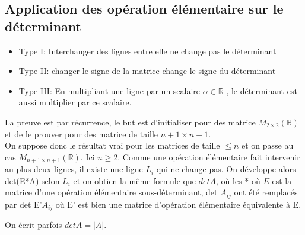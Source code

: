 
\subsection{Application des opération élémentaire sur le déterminant}
\begin{itemize}
    \item Type I: Interchanger des lignes entre elle ne change pas le déterminant
    \item Type II: changer le signe de la matrice change le signe du déterminant
    \item Type III: En multipliant une ligne par un scalaire $\alpha \in \mathbb{R}$ , le déterminant est aussi multiplier par ce scalaire.

     
\end{itemize}

La preuve est par récurrence, le but est d'initialiser pour des matrice $M_{2\times 2}(\mathbb{R})$ et de le prouver pour des matrice de taille $n+1\times n+1$. 
\\
On suppose donc le résultat vrai pour les matrices de taille $\leq n$ et on passe au cas $M_{n+1\times n+1}(\mathbb{R})$. Ici $n \geq 2$. Comme une opération élémentaire fait intervenir au plus deux lignes, il existe une ligne $L_i$ qui ne change pas. On développe alors det(E*A) selon $L_i$ et on obtien la même formule que $det A$, où les * où $E$ est la matrice d'une opération élémentaire sous-déterminant, det $A_{ij}$ ont été remplacés par det E'$A_{ij}$ où E' est bien une matrice d'opération élémentaire équivalente à E.
\begin{framedremark}
    On écrit parfois $det A = |A|$.
\end{framedremark}
    

